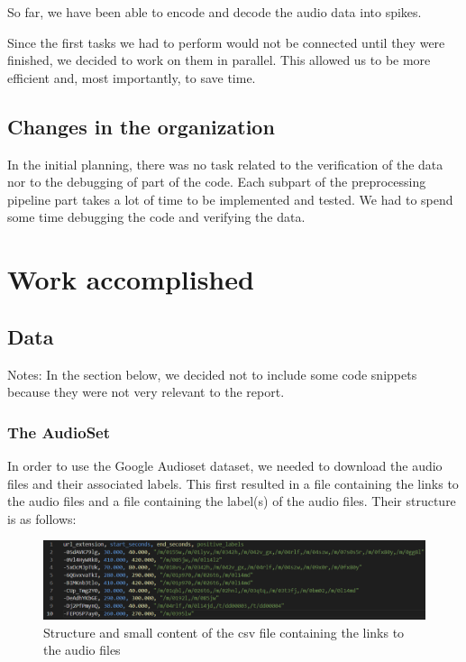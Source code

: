\documentclass[11pt]{article}
\begin{document}
So far, we have been able to encode and decode the audio data into spikes.


Since the first tasks we had to perform would not be connected until they were finished, we decided to work on them in parallel. This allowed us to be more efficient and, most importantly, to save time.

\subsection{Changes in the organization}

In the initial planning, there was no task related to the verification of the data nor to the debugging of part of the code. Each subpart of the preprocessing pipeline part takes a lot of time to be implemented and tested. We had to spend some time debugging the code and verifying the data.


\pagebreak

\section{Work accomplished}

\subsection{Data}

Notes: In the section below, we decided not to include some code snippets because they were not very relevant to the report.

\subsubsection{The AudioSet}

In order to use the Google Audioset dataset, we needed to download the audio files and their associated labels. This first resulted in a file containing the links to the audio files and a file containing the label(s) of the audio files.
Their structure is as follows:

\begin{figure}[h]
  \centering
  \includegraphics[width=\textwidth]{./image/structure_csv1.png}
  \caption{Structure and small content of the csv file containing the links to the audio files}
  \label{fig:structure_csv1}
\end{figure}
\end{document}
